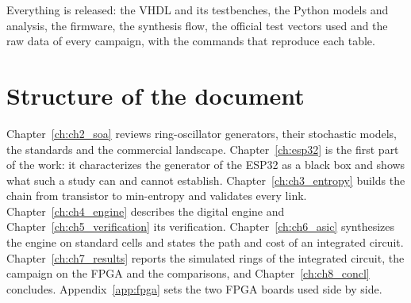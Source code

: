 Everything is released: the VHDL and its testbenches, the Python models
and analysis, the firmware, the synthesis flow, the official test vectors
used and the raw data of every campaign, with the commands that reproduce
each table.

\section{Structure of the document}
\label{sec:structure}

Chapter~\ref{ch:ch2_soa} reviews ring-oscillator generators, their
stochastic models, the standards and the commercial landscape.
Chapter~\ref{ch:esp32} is the first part of the work: it characterizes the
generator of the ESP32 as a black box and shows what such a study can and
cannot establish. Chapter~\ref{ch:ch3_entropy} builds the chain from transistor to
min-entropy and validates every link. Chapter~\ref{ch:ch4_engine}
describes the digital engine and Chapter~\ref{ch:ch5_verification} its
verification. Chapter~\ref{ch:ch6_asic} synthesizes the engine on standard
cells and states the path and cost of an integrated circuit.
Chapter~\ref{ch:ch7_results} reports the simulated rings of the
integrated circuit, the campaign on the FPGA and the comparisons,
and Chapter~\ref{ch:ch8_concl} concludes. Appendix~\ref{app:fpga} sets
the two FPGA boards used side by side.
